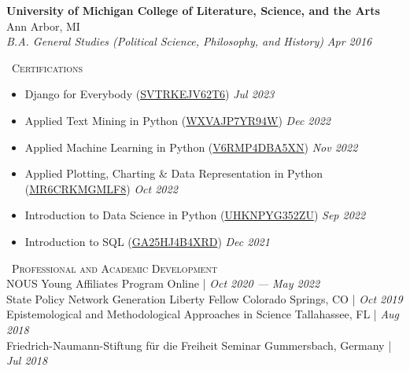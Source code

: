 \documentclass[a4paper,11pt]{article}
\newcommand{\header} [1] {
    \vspace*{2pt}
    {\textsc{\large{\xrfill[0.1ex]{0.5pt}~#1~\xrfill[0.1ex]{0.5pt}}}}
    \vspace*{2pt}
}
\begin{document}
\textbf{University of Michigan College of Literature, Science, and the Arts} \hfill Ann Arbor, MI\\
\textit{B.A. General Studies (Political Science, Philosophy, and History)} \hfill  \emph{Apr 2016}\\

\vspace{1mm}
\header{Certifications} \\
\begin{itemize}
    \item Django for Everybody (\href{https://www.coursera.org/account/accomplishments/specialization/SVTRKEJV62T6}{SVTRKEJV62T6}) \hfill \emph{Jul 2023}
    \item Applied Text Mining in Python (\href{https://www.coursera.org/account/accomplishments/verify/WXVAJP7YR94W}{WXVAJP7YR94W}) \hfill  \emph{Dec 2022}
    \item Applied Machine Learning in Python (\href{https://www.coursera.org/account/accomplishments/verify/V6RMP4DBA5XN}{V6RMP4DBA5XN}) \hfill  \emph{Nov 2022}
    \item Applied Plotting, Charting \& Data Representation in Python (\href{https://www.coursera.org/account/accomplishments/verify/MR6CRKMGMLF8}{MR6CRKMGMLF8}) \hfill
    \emph{Oct 2022}
    \item Introduction to Data Science in Python (\href{https://www.coursera.org/account/accomplishments/verify/UHKNPYG352ZU}{UHKNPYG352ZU}) \hfill  \emph{Sep 2022}
    \item Introduction to SQL (\href{https://www.coursera.org/account/accomplishments/verify/GA25HJ4B4XRD}{GA25HJ4B4XRD}) \hfill  \emph{Dec 2021}
\end{itemize}
\vspace{1mm}
\header{Professional and Academic Development} \\

NOUS Young Affiliates Program \hfill Online |  \emph{Oct 2020 --- May 2022} \\

State Policy Network Generation Liberty Fellow \hfill Colorado Springs, CO |  \emph{Oct 2019} \\

Epistemological and Methodological Approaches in Science \hfill Tallahassee, FL |  \emph{Aug 2018} \\

Friedrich-Naumann-Stiftung f\"{u}r die Freiheit Seminar \hfill Gummersbach, Germany |  \emph{Jul 2018} \\
\end{document}
